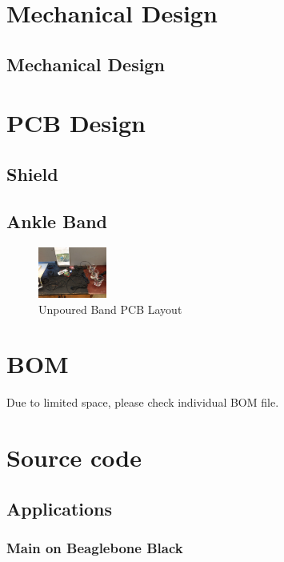 \begin{appendices}
    \section{Mechanical Design}
        \subsection{Mechanical Design}
            \label{sw:structure}

            


    \section{PCB Design}
        \subsection{Shield}
           
        \subsection{Ankle Band}
            \label{ad:band}
            \begin{figure}[H]
            \centering
            \includegraphics[width=0.2\textwidth]{overall.jpg}
            \caption{\label{fig:band_layout}Unpoured Band PCB Layout}
            \end{figure}

    \section{BOM}
    Due to limited space, please check individual BOM file.

    \section{Source code}
        \subsection{Applications}
            \label{source:applications}
            \subsubsection{Main on Beaglebone Black}
                

\end{appendices}
